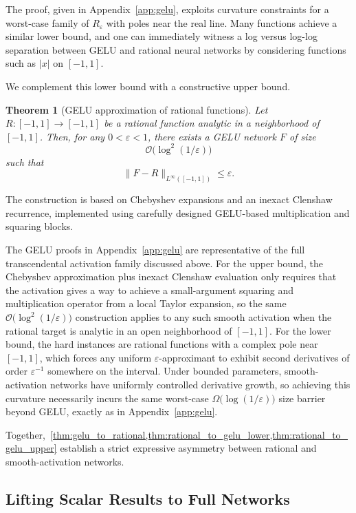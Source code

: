 \documentclass{article}
\theoremstyle{plain}
\newtheorem{theorem}{Theorem}[section]
\theoremstyle{definition}
\theoremstyle{remark}
\begin{document}
 {The proof, given in Appendix~\ref{app:gelu}, exploits curvature constraints for a worst-case family of $R_\varepsilon$ with poles near the real line. Many functions achieve a similar lower bound, and one can immediately witness a log versus log-log separation between GELU and rational neural networks by considering functions such as $|x|$ on $[-1,1]$.}

We complement this lower bound with a constructive upper bound.

\begin{theorem}[GELU approximation of rational functions]
\label{thm:rational_to_gelu_upper}
Let $R:[-1,1]\to[-1,1]$ be a rational function analytic in a neighborhood of $[-1,1]$.  
Then, for any $0<\varepsilon<1$, there exists a GELU network $F$ of size
\[
\mathcal{O}\bigl(\log^2(1/\varepsilon)\bigr)
\]
such that
\[
\|F-R\|_{L^\infty([-1,1])}\le \varepsilon.
\]
\end{theorem}

The construction is based on Chebyshev expansions and an inexact Clenshaw recurrence, implemented using carefully designed GELU-based multiplication and squaring blocks.

 {The GELU proofs in Appendix~\ref{app:gelu} are representative of the full transcendental activation family discussed above. For the upper bound, the Chebyshev approximation plus inexact Clenshaw evaluation only requires that the activation gives a way to achieve a small-argument squaring and multiplication operator from a local Taylor expansion, so the same $\mathcal{O}\bigl(\log^2(1/\varepsilon)\bigr)$ construction applies to any such smooth activation when the rational target is analytic in an open neighborhood of $[-1,1]$. For the lower bound, the hard instances are rational functions with a complex pole near $[-1,1]$, which forces any uniform $\varepsilon$-approximant to exhibit second derivatives of order $\varepsilon^{-1}$ somewhere on the interval. Under bounded parameters, smooth-activation networks have uniformly controlled derivative growth, so achieving this curvature necessarily incurs the same worst-case $\Omega\bigl(\log(1/\varepsilon)\bigr)$ size barrier beyond GELU, exactly as in Appendix~\ref{app:gelu}.}

Together,~\cref{thm:gelu_to_rational,thm:rational_to_gelu_lower,thm:rational_to_gelu_upper} establish a strict expressive asymmetry between rational and smooth-activation networks.

\subsection{Lifting Scalar Results to Full Networks}
\end{document}

